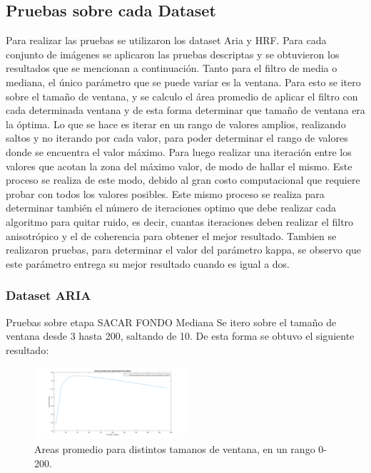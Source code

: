 \subsection{Pruebas sobre cada Dataset}
Para realizar las pruebas se utilizaron los dataset Aria  y HRF. Para cada conjunto de imágenes se aplicaron las pruebas descriptas y se obtuvieron los resultados que se mencionan a continuación.
Tanto para el filtro de media o mediana, el único parámetro que se puede variar es la ventana. Para esto se itero sobre el tamaño de ventana, y se calculo el área promedio de aplicar el filtro con cada determinada ventana y de esta forma determinar que tamaño de ventana era la óptima. Lo que se hace es iterar en un rango de valores amplios, realizando saltos y no iterando por cada valor, para poder determinar el rango de valores donde se encuentra el valor máximo. Para luego realizar una iteración entre los valores que acotan la zona del máximo valor, de modo de hallar el mismo.  Este proceso se realiza de este modo, debido al gran costo computacional que requiere probar con todos los valores posibles. 
Este mismo proceso se realiza para determinar también el número de iteraciones optimo que debe realizar cada algoritmo para quitar ruido, es decir, cuantas iteraciones deben realizar el filtro anisotrópico y el de coherencia para obtener el mejor resultado. Tambien se realizaron pruebas, para determinar el valor del parámetro kappa, se observo que este parámetro entrega su mejor resultado cuando es igual a dos.


\subsubsection{Dataset ARIA}

Pruebas sobre etapa SACAR  FONDO 
Mediana 
 Se itero sobre el tamaño de ventana desde 3 hasta 200, saltando de 10. De esta forma se obtuvo el siguiente resultado:

\begin{figure}[h]
	{
	\centering
	\includegraphics[width=0.50\textwidth]{Figures/MedianaRangoGrande}
	\caption[An Electron]{Areas promedio para distintos tamanos de ventana, en un rango 0-200.}
	}
\end{figure}	

